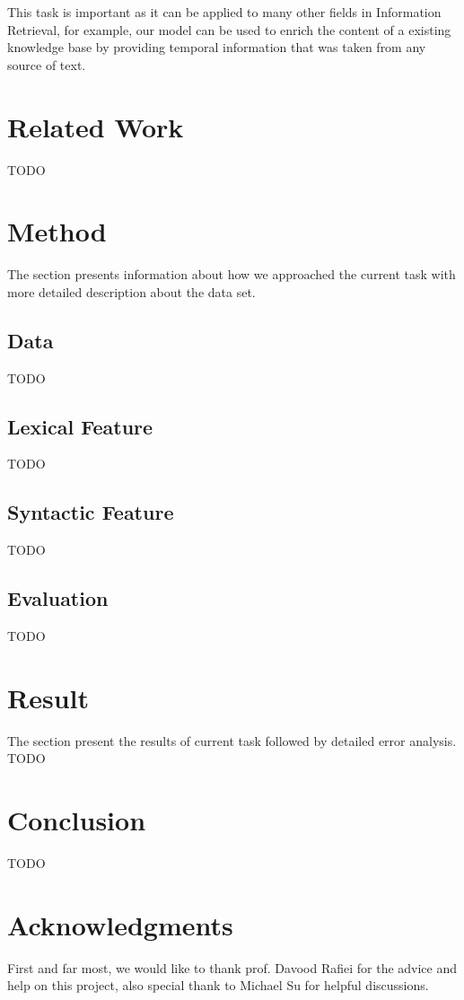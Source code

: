 \documentclass[11pt,a4paper]{article}
\begin{document}
This task is important as it can be applied to many other fields in Information Retrieval, for example, our model can be used to enrich the content of a existing knowledge base by providing temporal information that was taken from any source of text. 

\section{Related Work}
TODO

\section{Method}
The section presents information about how we approached the current task with more detailed description about the data set. 

\subsection{Data}
TODO

\subsection{Lexical Feature}
TODO

\subsection{Syntactic Feature}
TODO


\subsection{Evaluation}
TODO

\section{Result}
The section present the results of current task followed by detailed error analysis. 
TODO

\section{Conclusion}
TODO

\section*{Acknowledgments}

First and far most, we would like to thank prof. Davood Rafiei for the advice and help on this project, also special thank to Michael Su for helpful discussions.


\end{document}
